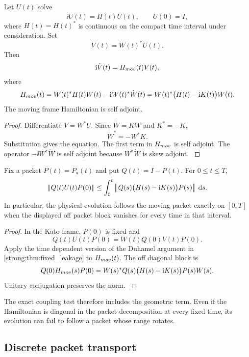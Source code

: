 \begin{theorem}\label{strong:theorem:014}\label{strong:thm:moving_frame}
Let \(U(t)\) solve
\[
\ii\dot U(t)=H(t)U(t),
\qquad
U(0)=I,
\]
where \(H(t)=H(t)^*\) is continuous on the compact time interval under consideration. Set
\[
V(t)=W(t)^*U(t).
\]
Then
\[
\ii\dot V(t)=H_{\rm mov}(t)V(t),
\]
where
\[
H_{\rm mov}(t)
=
W(t)^*H(t)W(t)-\ii W(t)^*\dot W(t)
=
W(t)^*\bigl(H(t)-\ii K(t)\bigr)W(t).
\]
The moving frame Hamiltonian is self adjoint.
\end{theorem}

\begin{proof}\label{strong:proof:023}
Differentiate \(V=W^*U\). Since \(\dot W=KW\) and \(K^*=-K\),
\[
\dot W^*=-W^*K.
\]
Substitution gives the equation. The first term in \(H_{\rm mov}\) is self adjoint. The operator \(-\ii W^*\dot W\) is self adjoint because \(W^*\dot W\) is skew adjoint.
\label{strong:proof:023:end}\end{proof}

\begin{theorem}\label{strong:theorem:015}\label{strong:thm:moving_leakage}
Fix a packet \(P(t)=P_a(t)\) and put \(Q(t)=I-P(t)\). For \(0\leq t\leq T\),
\[
\norm{Q(t)U(t)P(0)}
\leq
\int_0^t
\norm{Q(s)\bigl(H(s)-\ii K(s)\bigr)P(s)}
\dd s.
\]
In particular, the physical evolution follows the moving packet exactly on \([0,T]\) when the displayed off packet block vanishes for every time in that interval.
\end{theorem}

\begin{proof}\label{strong:proof:024}
In the Kato frame, \(P(0)\) is fixed and
\[
Q(t)U(t)P(0)
=
W(t)Q(0)V(t)P(0).
\]
Apply the time dependent version of the Duhamel argument in \cref{strong:thm:fixed_leakage} to \(H_{\rm mov}(t)\). The off diagonal block is
\[
Q(0)H_{\rm mov}(s)P(0)
=
W(s)^*Q(s)\bigl(H(s)-\ii K(s)\bigr)P(s)W(s).
\]
Unitary conjugation preserves the norm.
\label{strong:proof:024:end}\end{proof}

The exact coupling test therefore includes the geometric term. Even if the Hamiltonian is diagonal in the packet decomposition at every fixed time, its evolution can fail to follow a packet whose range rotates.

\subsection{Discrete packet transport}\label{strong:subsec:discrete_transport}

